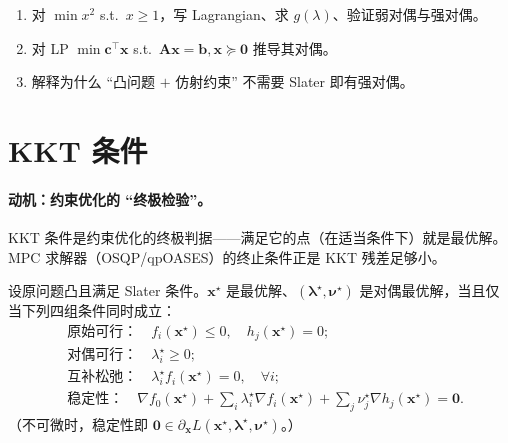 \begin{practice}
\begin{enumerate}
  \item 对 $\min x^2$ s.t.\ $x\ge1$，写 Lagrangian、求 $g(\lambda)$、验证弱对偶与强对偶。
  \item 对 LP $\min\mathbf c^\top\mathbf x$ s.t.\ $\mathbf A\mathbf x=\mathbf b,\mathbf x\succeq\mathbf 0$ 推导其对偶。
  \item 解释为什么 “凸问题 $+$ 仿射约束” 不需要 Slater 即有强对偶。
\end{enumerate}
\end{practice}

\section{KKT 条件}
\label{sec:cvx-kkt}

\paragraph{动机：约束优化的 “终极检验”。}
KKT 条件是约束优化的终极判据——满足它的点（在适当条件下）就是最优解。MPC 求解器（OSQP/qpOASES）的终止条件正是 KKT 残差足够小。

\begin{theorem}[KKT 条件]\label{thm:kkt}
设原问题凸且满足 Slater 条件。$\mathbf x^\star$ 是最优解、$(\boldsymbol\lambda^\star,\boldsymbol\nu^\star)$ 是对偶最优解，当且仅当下列四组条件同时成立：
\begin{subequations}\label{eq:kkt}
\begin{align}
  &\text{原始可行：}\quad f_i(\mathbf x^\star)\le0,\quad h_j(\mathbf x^\star)=0;\label{eq:kkt-primal}\\
  &\text{对偶可行：}\quad\lambda_i^\star\ge0;\label{eq:kkt-dual}\\
  &\text{互补松弛：}\quad\lambda_i^\star f_i(\mathbf x^\star)=0,\quad\forall i;\label{eq:kkt-comp}\\
  &\text{稳定性：}\quad\nabla f_0(\mathbf x^\star)+\sum_i\lambda_i^\star\nabla f_i(\mathbf x^\star)+\sum_j\nu_j^\star\nabla h_j(\mathbf x^\star)=\mathbf 0.\label{eq:kkt-stat}
\end{align}
\end{subequations}
（不可微时，稳定性即 $\mathbf 0\in\partial_{\mathbf x}L(\mathbf x^\star,\boldsymbol\lambda^\star,\boldsymbol\nu^\star)$。）
\end{theorem}

